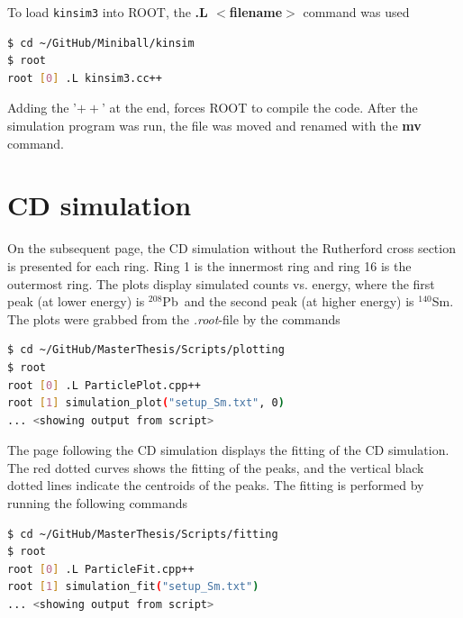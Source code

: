 \documentclass[twoside,english]{uiofysmaster/uiofysmaster}
\newcommand{\Sm}{$^{140}$Sm} %
\newcommand{\Pb}{$^{208}$Pb}
\begin{document}
\begin{appendices}
To load \texttt{kinsim3} into ROOT, the \textbf{.L $<$filename$>$} command was used
\begin{lstlisting}[language=sh]
$ cd ~/GitHub/Miniball/kinsim
$ root
root [0] .L kinsim3.cc++
\end{lstlisting}
Adding the '$++$' at the end, forces ROOT to compile the code. 
After the simulation program was run, the file was moved and renamed with the \textbf{mv} command. 


\section{CD simulation}
On the subsequent page, the CD simulation without the Rutherford cross section is presented for each ring. 
Ring 1 is the innermost ring and ring 16 is the outermost ring. 
The plots display simulated counts vs. energy, where the first peak (at lower energy) is \Pb\ and the second peak (at higher energy) is \Sm. 
The plots were grabbed from the \textit{.root}-file by the commands
\begin{lstlisting}[language=sh]
$ cd ~/GitHub/MasterThesis/Scripts/plotting
$ root
root [0] .L ParticlePlot.cpp++
root [1] simulation_plot("setup_Sm.txt", 0)
... <showing output from script>
\end{lstlisting}


The page following the CD simulation displays the fitting of the CD simulation. 
The red dotted curves shows the fitting of the peaks, and the vertical black dotted lines indicate the centroids of the peaks.
The fitting is performed by running the following commands
\begin{lstlisting}[language=sh]
$ cd ~/GitHub/MasterThesis/Scripts/fitting
$ root
root [0] .L ParticleFit.cpp++
root [1] simulation_fit("setup_Sm.txt")
... <showing output from script>
\end{lstlisting}



\end{appendices}
\end{document}
